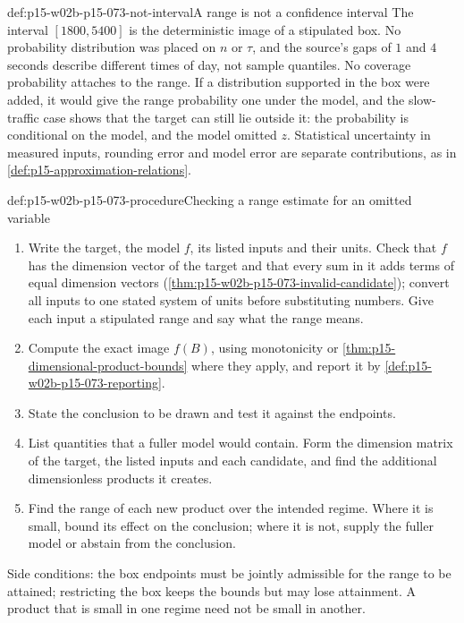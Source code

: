 \begin{hbwarning}{def:p15-w02b-p15-073-not-interval}{A range is not a confidence interval}
The interval \([1800,5400]\) is the deterministic image of a stipulated box.
No probability distribution was placed on \(n\) or \(\tau\), and the source's
gaps of \(1\) and \(4\) seconds describe different times of day, not sample
quantiles. No coverage probability attaches to the range. If a distribution
supported in the box were added, it would give the range probability one
under the model, and the slow-traffic case shows that the target can still
lie outside it: the probability is conditional on the model, and the model
omitted \(z\). Statistical uncertainty in measured inputs, rounding error and
model error are separate contributions, as in
\cref{def:p15-approximation-relations}.
\end{hbwarning}

\begin{hbmethod}{def:p15-w02b-p15-073-procedure}{Checking a range estimate for an omitted variable}
\begin{enumerate}
\item Write the target, the model \(f\), its listed inputs and their units.
Check that \(f\) has the dimension vector of the target and that every sum
in it adds terms of equal dimension vectors
(\cref{thm:p15-w02b-p15-073-invalid-candidate}); convert all inputs to one
stated system of units before substituting numbers.
Give each input a stipulated range and say what the range means.
\item Compute the exact image \(f(B)\), using monotonicity or
\cref{thm:p15-dimensional-product-bounds} where they apply, and report it by
\cref{def:p15-w02b-p15-073-reporting}.
\item State the conclusion to be drawn and test it against the endpoints.
\item List quantities that a fuller model would contain. Form the dimension
matrix of the target, the listed inputs and each candidate, and find the
additional dimensionless products it creates.
\item Find the range of each new product over the intended regime. Where it is
small, bound its effect on the conclusion; where it is not, supply the fuller
model or abstain from the conclusion.
\end{enumerate}
Side conditions: the box endpoints must be jointly admissible for the range to
be attained; restricting the box keeps the bounds but may lose attainment.
A product that is small in one regime need not be small in another.
\end{hbmethod}

